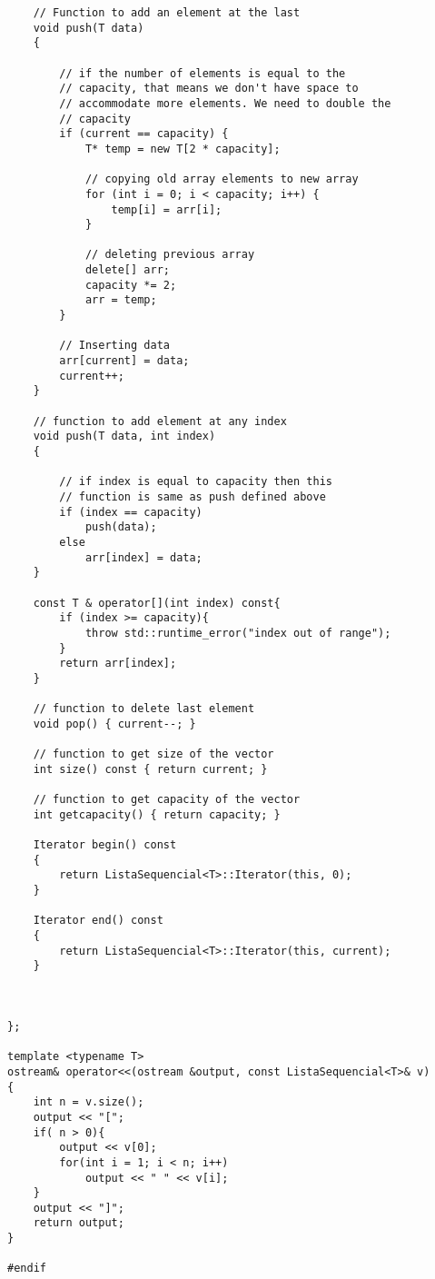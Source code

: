 \begin{verbatim}
    

 
    // Function to add an element at the last
    void push(T data)
    {
 
        // if the number of elements is equal to the
        // capacity, that means we don't have space to
        // accommodate more elements. We need to double the
        // capacity
        if (current == capacity) {
            T* temp = new T[2 * capacity];
 
            // copying old array elements to new array
            for (int i = 0; i < capacity; i++) {
                temp[i] = arr[i];
            }
 
            // deleting previous array
            delete[] arr;
            capacity *= 2;
            arr = temp;
        }
 
        // Inserting data
        arr[current] = data;
        current++;
    }
 
    // function to add element at any index
    void push(T data, int index)
    {
 
        // if index is equal to capacity then this
        // function is same as push defined above
        if (index == capacity)
            push(data);
        else
            arr[index] = data;
    }
 
    const T & operator[](int index) const{
        if (index >= capacity){
            throw std::runtime_error("index out of range");
        }
        return arr[index];
    }
 
    // function to delete last element
    void pop() { current--; }
 
    // function to get size of the vector
    int size() const { return current; }
 
    // function to get capacity of the vector
    int getcapacity() { return capacity; }
 
    Iterator begin() const
    {
        return ListaSequencial<T>::Iterator(this, 0);
    }

    Iterator end() const 
    {
        return ListaSequencial<T>::Iterator(this, current);
    }



};

template <typename T>
ostream& operator<<(ostream &output, const ListaSequencial<T>& v)
{
    int n = v.size();
    output << "[";
    if( n > 0){
        output << v[0];
        for(int i = 1; i < n; i++)
            output << " " << v[i];
    }
    output << "]";
    return output;
}

#endif
\end{verbatim}



